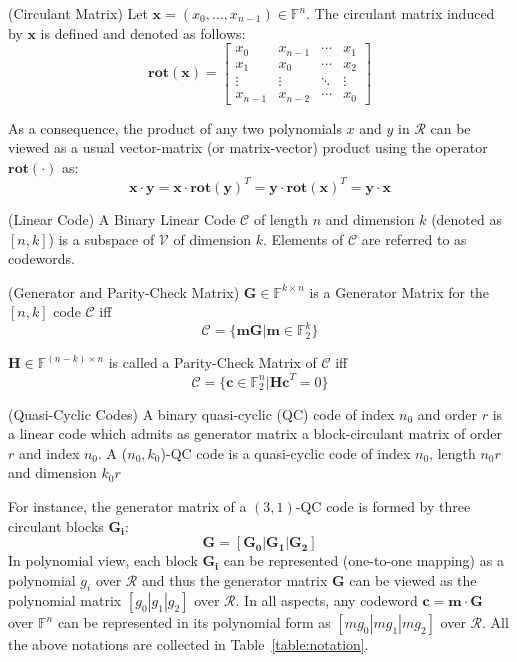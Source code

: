 \documentclass[runningheads]{llncs}
\begin{document}
\begin{definition}{(Circulant Matrix)}
Let $\mathbf{x}=(x_0,\ldots,x_{n-1})\in \mathbb{F}^n$. The circulant matrix induced by $\mathbf{x}$ is defined and denoted as follows:
\[
 \mathbf{rot(x)} = \left[ \begin{array}{cccc}
        x_0 & x_{n-1} & \cdots &x_{1}\\
        x_{1} & x_{0} & \cdots &x_{2}\\
        \vdots & \vdots & \ddots & \vdots \\
        x_{n-1} & x_{n-2} & \cdots & x_{0}
        \end{array}\right ]
\]
\end{definition}

As a consequence, the product of any two polynomials $x$ and $y$ in $\mathcal{R}$ can be viewed as a usual vector-matrix (or matrix-vector) product using the operator $\mathbf{rot(\cdot)}$ as:
\[
   \mathbf{x\cdot y}=\mathbf{x}\cdot \mathbf{rot(y)}^T=\mathbf{y}\cdot \mathbf{rot(x)}^T=\mathbf{y\cdot x}
\]

\begin{definition}{(Linear Code)}
A Binary Linear Code $\mathcal{C}$ of length $n$ and dimension $k$ (denoted as $[n,k]$) is a subspace of $\mathcal{V}$ of dimension $k$. Elements of $\mathcal{C}$ are referred to as codewords.
\end{definition}

\begin{definition}{(Generator and Parity-Check Matrix)}
$\mathbf{G}\in \mathbb{F}^{k\times n}$ is a Generator Matrix for the $[n,k]$ code $\mathcal{C}$ iff
\[
\mathcal{C}=\{\mathbf{mG}|\mathbf{m}\in \mathbb{F}_2^k\}
\]

$\mathbf{H}\in \mathbb{F}^{(n-k)\times n}$ is called a Parity-Check Matrix of $\mathcal{C}$ iff
\[
\mathcal{C}=\{\mathbf{c} \in \mathbb{F}_2^n |\mathbf{Hc}^T=0\}
\]
\end{definition}


\begin{definition}{(Quasi-Cyclic Codes)}
A binary quasi-cyclic (QC) code of index $n_0$ and order $r$ is a linear code which admits as generator matrix a block-circulant matrix of order $r$ and index $n_0$.
A ($n_0,k_0$)-QC code is a quasi-cyclic code of index $n_0$, length $n_0r$ and dimension $k_0r$
\end{definition}

For instance, the generator matrix of a $(3,1)$-QC code is formed by three circulant blocks $\mathbf{G_i}$:
\[
\mathbf{G}=[\mathbf{G_0}|\mathbf{G_1}|\mathbf{G_2}]
\]
In polynomial view, each block $\mathbf{G_i}$ can be represented (one-to-one mapping) as a polynomial $g_i$ over $\mathcal{R}$ and thus the generator matrix $\mathbf{G}$ can be viewed as the polynomial matrix $[g_0|g_1|g_2]$ over $\mathcal{R}$. In all aspects, any codeword $\mathbf{c}=\mathbf{m}\cdot\mathbf{G}$ over $\mathbb{F}^{n}$ can be represented in its polynomial form as $[mg_0|mg_1|mg_2]$ over $\mathcal{R}$. All the above notations are collected in
Table~\ref{table:notation}.
\end{document}
